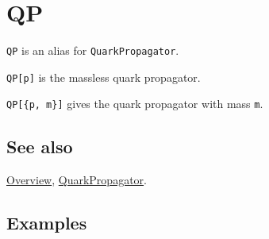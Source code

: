 \documentclass[../FeynCalcManual.tex]{subfiles}
\begin{document}
\hypertarget{qp}{%
\section{QP}\label{qp}}

\texttt{QP} is an alias for \texttt{QuarkPropagator}.

\texttt{QP[\allowbreak{}p]} is the massless quark propagator.

\texttt{QP[\allowbreak{}\{\allowbreak{}p,\ \allowbreak{}m\}]} gives the
quark propagator with mass \texttt{m}.

\subsection{See also}

\hyperlink{toc}{Overview}, \hyperlink{quarkpropagator}{QuarkPropagator}.

\subsection{Examples}
\end{document}
